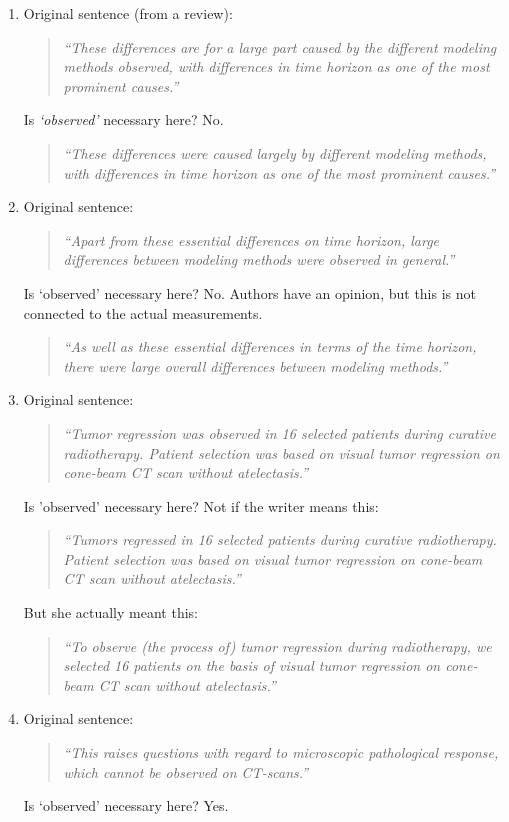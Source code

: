 \documentclass[graybox,envcountchap,sectrefs,UStrade]{svmono}
\begin{document}
\begin{enumerate}
  \item Original sentence (from a review):
    \begin{quote}
    \emph{``These differences are for a large part caused by the different modeling methods observed, with differences in time horizon as one of the most prominent causes.''}
  \end{quote}
  Is \emph{`observed'} necessary here? No.
  \begin{quote}
  \emph{``These differences were caused largely by different modeling methods, with differences in time horizon as one of the most prominent causes.''}
  \end{quote}
  \item Original sentence:
    \begin{quote}
    \emph{``Apart from these essential differences on time horizon, large differences between modeling methods were observed in general.''}
  \end{quote}
  Is `observed' necessary here? No. Authors have an opinion, but this is not connected to the actual measurements.
  \begin{quote}
  \emph{``As well as these essential differences in terms of the time horizon, there were large overall differences between modeling methods.''}
  \end{quote}
  \item Original sentence:
  \begin{quote}
  \emph{``Tumor regression was observed in 16 selected patients during curative radiotherapy. Patient selection was based on visual tumor regression on cone-beam CT scan without atelectasis.''}
  \end{quote}
  Is 'observed' necessary here? Not if the writer means this:
  \begin{quote}
  \emph{``Tumors regressed in 16 selected patients during curative radiotherapy. Patient selection was based on visual tumor regression on cone-beam CT scan without atelectasis.''}
  \end{quote}
  But she actually meant this:
  \begin{quote}
  \emph{``To observe (the process of) tumor regression during radiotherapy, we selected 16 patients on the basis of visual tumor regression on cone-beam CT scan without atelectasis.''}
  \end{quote}
  \item Original sentence:
  \begin{quote}
    \emph{``This raises questions with regard to microscopic pathological response, which cannot be observed on CT-scans.''}
  \end{quote}
  Is `observed' necessary here? Yes.
\end{enumerate}
\end{document}
